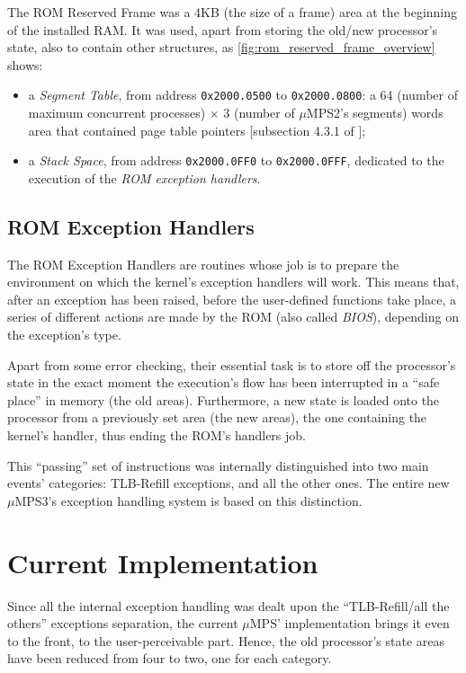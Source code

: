 \documentclass[12pt,a4paper,openright,twoside]{report}
\begin{document}
The ROM Reserved Frame was a 4KB (the size of a frame) area at the beginning of the installed RAM.
It was used, apart from storing the old/new processor's state, also to contain other structures, as \autoref{fig:rom_reserved_frame_overview} shows:
\begin{itemize}
	\item a \textit{Segment Table}, from address \texttt{0x2000.0500} to \texttt{0x2000.0800}: a 64 (number of maximum concurrent processes) $\times$ 3 (number of $\mu$MPS2's segments) words area that contained page table pointers [subsection 4.3.1 of \cite{old_pops}];
	\item a \textit{Stack Space}, from address \texttt{0x2000.0FF0} to \texttt{0x2000.0FFF}, dedicated to the execution of the \textit{ROM exception handlers}.
\end{itemize}

\subsection{ROM Exception Handlers}
The ROM Exception Handlers are routines whose job is to prepare the environment on which the kernel's exception handlers will work.
This means that, after an exception has been raised, before the user-defined functions take place, a series of different actions are made by the ROM (also called \textit{BIOS}), depending on the exception's type.

Apart from some error checking, their essential task is to store off the processor's state in the exact moment the execution's flow has been interrupted in a ``safe place'' in memory (the old areas).
Furthermore, a new state is loaded onto the processor from a previously set area (the new areas), the one containing the kernel's handler, thus ending the ROM's handlers job.

This ``passing'' set of instructions was internally distinguished into two main events' categories: TLB-Refill exceptions, and all the other ones.
The entire new $\mu$MPS3's exception handling system is based on this distinction.

\section{Current Implementation}
\label{chap:new_exception_handling}
Since all the internal exception handling was dealt upon the ``TLB-Refill/all the others'' exceptions separation, the current $\mu$MPS' implementation brings it even to the front, to the user-perceivable part.
Hence, the old processor's state areas have been reduced from four to two, one for each category.
\end{document}
